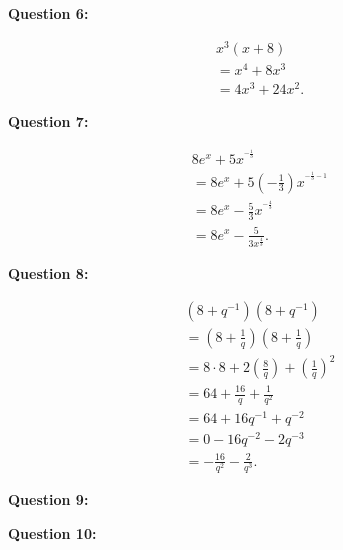 \documentclass{report}
\begin{document}
    \bigbreak \noindent \bigbreak \noindent 
    \begin{Large}
        \noindent \textbf{Question 6:}
    \end{Large}
    \bigbreak \noindent 
    \bigbreak \noindent 
    \begin{align*}
        x^3(x+8) \\
        = x^4+8x^3 \\ 
        = 4x^3 +24x^2
    .\end{align*}

    \bigbreak \noindent \bigbreak \noindent 
    \begin{Large}
        \noindent \textbf{Question 7:}
    \end{Large}
    \bigbreak \noindent 
    \bigbreak \noindent 
    \begin{align*}
        8e^x + 5x^{ ^{-\frac{1}{3}}} \\
        = 8e^x+5(- \frac{1}{3})x^{ ^{-\frac{1}{3} - 1}} \\ 
        = 8e^x - \frac{5}{3}x^{ ^{-\frac{4}{3}}} \\
        = 8e^x - \frac{5}{3x^{ \frac{4}{3}}}
    .\end{align*}

    \bigbreak \noindent \bigbreak \noindent 
    \begin{Large}
        \noindent \textbf{Question 8:}
    \end{Large}
    \bigbreak \noindent 
    \bigbreak \noindent 
    \begin{align*}
        (8+q^{-1})(8+q^{-1}) \\ 
        =(8+ \frac{1}{q})(8+ \frac{1}{q}) \\
        =8 \cdot 8+2( \frac{8}{q}) + ( \frac{1}{q})^2 \\ 
        = 64+ \frac{16}{q} + \frac{1}{q^2} \\ 
        = 64 +16q^{-1} + q^{-2} \\ 
        = 0 -16q^{-2} -2q^{-3} \\ 
        = - \frac{16}{q^2} - \frac{2}{q^3}
    .\end{align*}

    \bigbreak \noindent \bigbreak \noindent 
    \begin{Large}
        \noindent \textbf{Question 9:}
    \end{Large}
    \bigbreak \noindent 
    \bigbreak \noindent 

    \bigbreak \noindent \bigbreak \noindent 
    \begin{Large}
        \noindent \textbf{Question 10:}
    \end{Large}
    \bigbreak \noindent 
    \bigbreak \noindent 
\end{document}
